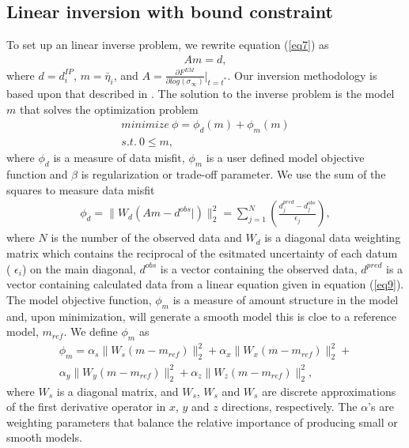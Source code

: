 \documentclass{segabs}
\begin{document}
\subsection{Linear inversion with bound constraint}
To set up an linear inverse problem, we rewrite equation (\ref{eq7}) as
\begin{eqnarray}
  Am=d,
  \label{eq9}
\end{eqnarray}
where $d=d^{IP}_{i}$, $m = \bar{\eta}_i$, and $A=\frac{\partial F^{EM}}{\partial log(\sigma_{\infty})}\bigg|_{t=t^*}$.
Our inversion methodology is based upon that described in \cite{doug1994}. The solution to the inverse problem is the model $m$ that solves the optimization problem
\begin{eqnarray}
  minimize \ \phi =  \phi_d(m) + \phi_m(m)\nonumber \\
  s.t. \ 0 \le m,
  \label{eq10}
\end{eqnarray}
where $\phi_d$ is a measure of data misfit, $\phi_m$ is a user defined model objective function and $\beta$ is regularization or trade-off parameter. We use the sum of the squares to measure data misfit
\begin{eqnarray}
  \phi_d = \| W_d(Am-d^{obs}|)\|^2_2 =
  \sum^N_{j=1}(\frac{d^{pred}_j-d^{obs}_j}{\epsilon_j}),
  \label{eq11}
\end{eqnarray}
where $N$ is the number of the observed data and $W_d$ is a diagonal data weighting matrix which contains the reciprocal of the esitmated uncertainty of each datum (
$\epsilon_i$) on the main diagonal,  $d^{obs}$ is a vector containing the observed data, $d^{pred}$ is a vector containing calculated data from a linear equation given in equation (\ref{eq9}).
The model objective function, $\phi_m$ is a measure of amount structure in the model and, upon minimization, will generate a smooth model this is cloe to a reference model, $m_{ref}$. We define $\phi_m$ as
\begin{eqnarray}
  \phi_m = \alpha_s\| W_s(m-m_{ref})\|^2_2+
       \alpha_x\| W_x(m-m_{ref})\|^2_2+ \nonumber \\
       \alpha_y\| W_y(m-m_{ref})\|^2_2+
       \alpha_z\| W_z(m-m_{ref})\|^2_2,
  \label{eq12}
\end{eqnarray}
where $W_s$ is a diagonal matrix, and $W_s$, $W_s$ and $W_s$ are discrete approximations of the first derivative operator in $x$, $y$ and $z$ directions, respectively. The $\alpha$'s are weighting parameters that balance the relative importance of producing small or smooth models.
\end{document}
